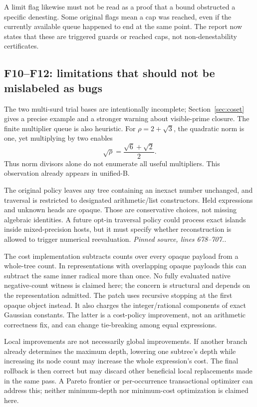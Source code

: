 \documentclass[11pt,a4paper]{article}
\newcommand{\src}[1]{\textit{Pinned source, lines #1.}}
\theoremstyle{remark}\newtheorem{remark}[theorem]{Remark}
\begin{document}
A limit flag likewise must not be read as a proof that a bound obstructed a specific denesting. Some original flags mean a cap was reached, even if the currently available queue happened to end at the same point. The report now states that these are triggered guards or reached caps, not non-denestability certificates.

\subsection{F10--F12: limitations that should not be mislabeled as bugs}
The two multi-surd trial bases are intentionally incomplete; Section~\ref{sec:coset} gives a precise example and a stronger warning about visible-prime closure. The finite multiplier queue is also heuristic. For $\rho=2+\sqrt3$, the quadratic norm is one, yet multiplying by two enables
\[
 \sqrt\rho=\frac{\sqrt6+\sqrt2}{2}.
\]
Thus norm divisors alone do not enumerate all useful multipliers. This observation already appears in unified-B.\cite{reviewB}

The original policy leaves any tree containing an inexact number unchanged, and traversal is restricted to designated arithmetic/list constructors. Held expressions and unknown heads are opaque. Those are conservative choices, not missing algebraic identities. A future opt-in traversal policy could process exact islands inside mixed-precision hosts, but it must specify whether reconstruction is allowed to trigger numerical reevaluation. \src{678--707.}

The cost implementation subtracts counts over every opaque payload from a whole-tree count. In representations with overlapping opaque payloads this can subtract the same inner radical more than once. No fully evaluated native negative-count witness is claimed here; the concern is structural and depends on the representation admitted. The patch uses recursive stopping at the first opaque object instead. It also charges the integer/rational components of exact Gaussian constants. The latter is a cost-policy improvement, not an arithmetic correctness fix, and can change tie-breaking among equal expressions.

Local improvements are not necessarily global improvements. If another branch already determines the maximum depth, lowering one subtree's depth while increasing its node count may increase the whole expression's cost. The final rollback is then correct but may discard other beneficial local replacements made in the same pass. A Pareto frontier or per-occurrence transactional optimizer can address this; neither minimum-depth nor minimum-cost optimization is claimed here.
\end{document}
